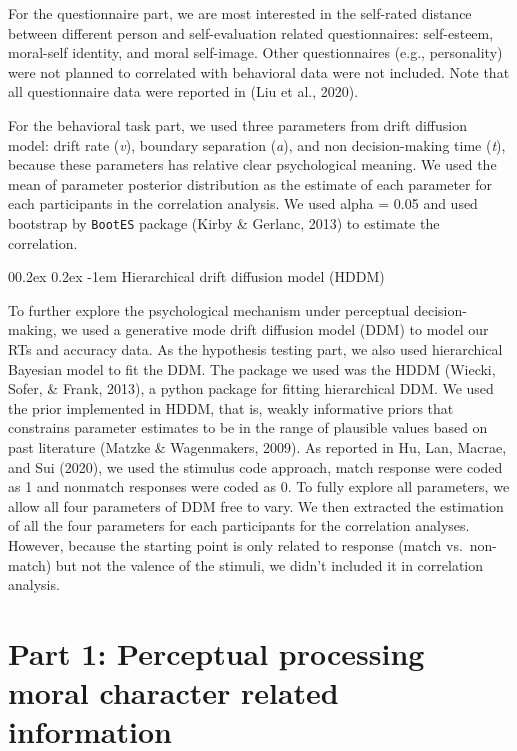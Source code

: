 \documentclass[
  english,
  man]{apa6}
\makeatletter
\let\oldparagraph\paragraph
\renewcommand{\paragraph}[1]{\oldparagraph{#1}\mbox{}}
\renewcommand{\paragraph}{\@startsection{paragraph}{4}{\parindent}%
  {0\baselineskip \@plus 0.2ex \@minus 0.2ex}%
  {-1em}%
  {\normalfont\normalsize\bfseries\itshape\typesectitle}}
\makeatother
\begin{document}
For the questionnaire part, we are most interested in the self-rated distance between different person and self-evaluation related questionnaires: self-esteem, moral-self identity, and moral self-image. Other questionnaires (e.g., personality) were not planned to correlated with behavioral data were not included. Note that all questionnaire data were reported in (Liu et al., 2020).

For the behavioral task part, we used three parameters from drift diffusion model: drift rate (\emph{v}), boundary separation (\emph{a}), and non decision-making time (\emph{t}), because these parameters has relative clear psychological meaning. We used the mean of parameter posterior distribution as the estimate of each parameter for each participants in the correlation analysis. We used alpha = 0.05 and used bootstrap by \texttt{BootES} package (Kirby \& Gerlanc, 2013) to estimate the correlation.

\hypertarget{hierarchical-drift-diffusion-model-hddm}{%
\paragraph{Hierarchical drift diffusion model (HDDM)}\label{hierarchical-drift-diffusion-model-hddm}}

To further explore the psychological mechanism under perceptual decision-making, we used a generative mode drift diffusion model (DDM) to model our RTs and accuracy data. As the hypothesis testing part, we also used hierarchical Bayesian model to fit the DDM. The package we used was the HDDM (Wiecki, Sofer, \& Frank, 2013), a python package for fitting hierarchical DDM. We used the prior implemented in HDDM, that is, weakly informative priors that constrains parameter estimates to be in the range of plausible values based on past literature (Matzke \& Wagenmakers, 2009). As reported in Hu, Lan, Macrae, and Sui (2020), we used the stimulus code approach, match response were coded as 1 and nonmatch responses were coded as 0. To fully explore all parameters, we allow all four parameters of DDM free to vary. We then extracted the estimation of all the four parameters for each participants for the correlation analyses. However, because the starting point is only related to response (match vs.~non-match) but not the valence of the stimuli, we didn't included it in correlation analysis.

\hypertarget{part-1-perceptual-processing-moral-character-related-information}{%
\section{Part 1: Perceptual processing moral character related information}\label{part-1-perceptual-processing-moral-character-related-information}}
\end{document}
